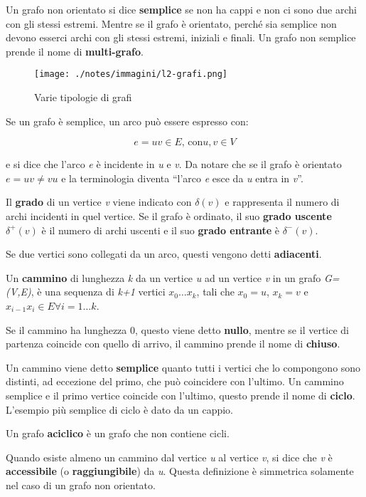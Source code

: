 Un grafo non orientato si dice \textbf{semplice} se non ha cappi e non
ci sono due archi con gli stessi estremi. Mentre se il grafo è
orientato, perché sia semplice non devono esserci archi con gli stessi
estremi, iniziali e finali. Un grafo non semplice prende il nome di
\textbf{multi-grafo}.

\begin{figure}[htbp]
\centering
\texttt{[image: ./notes/immagini/l2-grafi.png]}
\caption{Varie tipologie di grafi}
\end{figure}

Se un grafo è semplice, un arco può essere espresso con:

$$
e = uv \in E \text{, con} u,v \in V
$$

e si dice che l'arco \emph{e} è incidente in \emph{u} e \emph{v}. Da
notare che se il grafo è orientato
$e = uv \neq vu$ e la terminologia diventa
``l'arco \emph{e} esce da \emph{u} entra in \emph{v}''.

Il \textbf{grado} di un vertice \emph{v} viene indicato con $\delta(v)$ e rappresenta il numero di archi incidenti in quel
vertice. Se il grafo è ordinato, il suo \textbf{grado uscente} $\delta^+(v)$ è il numero di archi uscenti e il suo \textbf{grado entrante} è $\delta^-(v)$.

Se due vertici sono collegati da un arco, questi vengono detti
\textbf{adiacenti}.

Un \textbf{cammino} di lunghezza \emph{k} da un vertice \emph{u} ad un
vertice \emph{v} in un grafo \emph{G=(V,E)}, è una sequenza di
\emph{k+1} vertici $x_0 \ldots x_k$, tali che $x_0 = u$, $x_k = v$ e $x_{i-1}x_i \in E \forall i = 1\ldots k$.

Se il cammino ha lunghezza 0, questo viene detto \textbf{nullo}, mentre
se il vertice di partenza coincide con quello di arrivo, il cammino
prende il nome di \textbf{chiuso}.

Un cammino viene detto \textbf{semplice} quanto tutti i vertici che lo
compongono sono distinti, ad eccezione del primo, che può coincidere
con l'ultimo. Un cammino semplice e il primo vertice coincide con
l'ultimo, questo prende il nome di \textbf{ciclo}. L'esempio più
semplice di ciclo è dato da un cappio.

Un grafo \textbf{aciclico} è un grafo che non contiene cicli.

Quando esiste almeno un cammino dal vertice \emph{u} al vertice
\emph{v}, si dice che \emph{v} è \textbf{accessibile} (o
\textbf{raggiungibile}) da \emph{u}. Questa definizione è simmetrica
solamente nel caso di un grafo non orientato.

